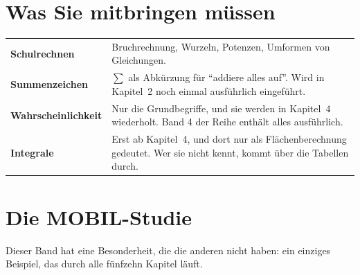 \section*{Was Sie mitbringen müssen}

\begin{merksatz}
\begin{center}
\renewcommand{\arraystretch}{1.5}
\begin{tabular}{@{}P{3.4cm}P{5.2cm}@{}}
\toprule
\textbf{Schulrechnen} & Bruchrechnung, Wurzeln, Potenzen, Umformen von Gleichungen.\\
\textbf{Summenzeichen} & $\sum$ als Abkürzung für \enquote{addiere alles auf}. Wird in Kapitel~2 noch einmal ausführlich eingeführt.\\
\textbf{Wahrschein\-lichkeit} & Nur die Grundbegriffe, und sie werden in Kapitel~4 wiederholt. Band 4 der Reihe enthält alles ausführlich.\\
\textbf{Integrale} & Erst ab Kapitel~4, und dort nur als Flächenberechnung gedeutet. Wer sie nicht kennt, kommt über die Tabellen durch.\\
\bottomrule
\end{tabular}
\end{center}

\begin{center}
\begin{minipage}{0.88\textwidth}
\end{minipage}
\end{center}
\end{merksatz}

\section*{Die MOBIL-Studie}

Dieser Band hat eine Besonderheit, die die anderen nicht haben: ein einziges Beispiel, das durch alle fünfzehn Kapitel läuft.

